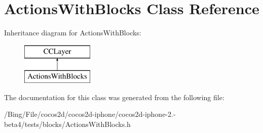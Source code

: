 \hypertarget{interface_actions_with_blocks}{\section{Actions\-With\-Blocks Class Reference}
\label{interface_actions_with_blocks}
}
Inheritance diagram for Actions\-With\-Blocks\-:\begin{figure}[H]
\begin{center}
\leavevmode
\includegraphics[height=2.000000cm]{interface_actions_with_blocks}
\end{center}
\end{figure}


The documentation for this class was generated from the following file\-:\begin{DoxyCompactItemize}
\item 
/\-Bing/\-File/cocos2d/cocos2d-\/iphone/cocos2d-\/iphone-\/2.-\/beta4/tests/blocks/Actions\-With\-Blocks.\-h\end{DoxyCompactItemize}
